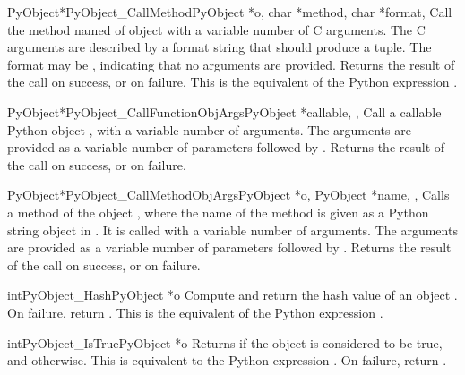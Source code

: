 \begin{cfuncdesc}{PyObject*}{PyObject_CallMethod}{PyObject *o,
                                                  char *method, char *format,
                                                  \moreargs}
  Call the method named  of object  with a variable
  number of C arguments.  The C arguments are described by a
   format string that should 
  produce a tuple.  The format may be \NULL,
  indicating that no arguments are provided. Returns the result of the
  call on success, or \NULL{} on failure.  This is the equivalent of
  the Python expression .
\end{cfuncdesc}


\begin{cfuncdesc}{PyObject*}{PyObject_CallFunctionObjArgs}{PyObject *callable,
                                                           \moreargs,
                                                           }
  Call a callable Python object , with a variable
  number of  arguments.  The arguments are provided
  as a variable number of parameters followed by \NULL.
  Returns the result of the call on success, or \NULL{} on failure.
\end{cfuncdesc}


\begin{cfuncdesc}{PyObject*}{PyObject_CallMethodObjArgs}{PyObject *o,
                                                         PyObject *name,
                                                         \moreargs,
                                                         }
  Calls a method of the object , where the name of the method
  is given as a Python string object in .  It is called with
  a variable number of  arguments.  The arguments are
  provided as a variable number of parameters followed by \NULL.
  Returns the result of the call on success, or \NULL{} on failure.
\end{cfuncdesc}


\begin{cfuncdesc}{int}{PyObject_Hash}{PyObject *o}
  Compute and return the hash value of an object .  On failure,
  return .  This is the equivalent of the Python expression
  .
\end{cfuncdesc}


\begin{cfuncdesc}{int}{PyObject_IsTrue}{PyObject *o}
  Returns  if the object  is considered to be true, and
   otherwise.  This is equivalent to the Python expression
  .  On failure, return . 
\end{cfuncdesc}


